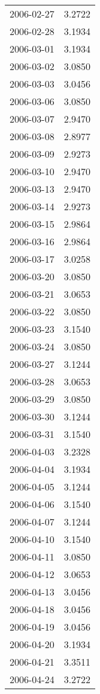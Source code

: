 \begin{tabular}{lr}
2006-02-27 &      3.2722 \\
2006-02-28 &      3.1934 \\
2006-03-01 &      3.1934 \\
2006-03-02 &      3.0850 \\
2006-03-03 &      3.0456 \\
2006-03-06 &      3.0850 \\
2006-03-07 &      2.9470 \\
2006-03-08 &      2.8977 \\
2006-03-09 &      2.9273 \\
2006-03-10 &      2.9470 \\
2006-03-13 &      2.9470 \\
2006-03-14 &      2.9273 \\
2006-03-15 &      2.9864 \\
2006-03-16 &      2.9864 \\
2006-03-17 &      3.0258 \\
2006-03-20 &      3.0850 \\
2006-03-21 &      3.0653 \\
2006-03-22 &      3.0850 \\
2006-03-23 &      3.1540 \\
2006-03-24 &      3.0850 \\
2006-03-27 &      3.1244 \\
2006-03-28 &      3.0653 \\
2006-03-29 &      3.0850 \\
2006-03-30 &      3.1244 \\
2006-03-31 &      3.1540 \\
2006-04-03 &      3.2328 \\
2006-04-04 &      3.1934 \\
2006-04-05 &      3.1244 \\
2006-04-06 &      3.1540 \\
2006-04-07 &      3.1244 \\
2006-04-10 &      3.1540 \\
2006-04-11 &      3.0850 \\
2006-04-12 &      3.0653 \\
2006-04-13 &      3.0456 \\
2006-04-18 &      3.0456 \\
2006-04-19 &      3.0456 \\
2006-04-20 &      3.1934 \\
2006-04-21 &      3.3511 \\
2006-04-24 &      3.2722 \\

\end{tabular}
